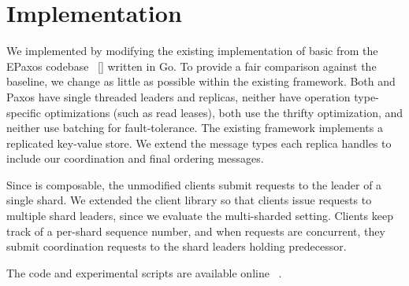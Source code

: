 \section{Implementation}
\label{sec:implementation}
We implemented \system by modifying the existing implementation of basic \mpaxos from the EPaxos codebase ~\ref{} written in Go. To provide a fair comparison against the \mpaxos baseline, we change as little as possible within the existing framework. Both \system and Paxos have single threaded leaders and replicas, neither have operation type-specific optimizations (such as read leases), both use the thrifty optimization, and neither use batching for fault-tolerance. The existing framework implements a replicated key-value store. We extend the message types each replica handles to include our coordination and final ordering messages.

Since \sdl is composable, the unmodified \mpaxos clients submit requests to the leader of a single shard. We extended the client library so that clients issue requests to multiple shard leaders, since we evaluate the multi-sharded setting. Clients keep track of a per-shard sequence number, and when requests are concurrent, they submit coordination requests to the shard leaders holding predecessor.

The code and experimental scripts are available online ~\cite{}.
